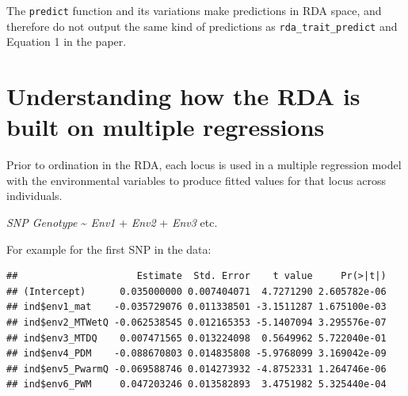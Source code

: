 \documentclass[
]{article}
\newenvironment{Shaded}{\begin{snugshade}}{\end{snugshade}}
\newcommand{\CommentTok}[1]{\textcolor[rgb]{0.56,0.35,0.01}{\textit{#1}}}
\newcommand{\DecValTok}[1]{\textcolor[rgb]{0.00,0.00,0.81}{#1}}
\newcommand{\FunctionTok}[1]{\textcolor[rgb]{0.00,0.00,0.00}{#1}}
\newcommand{\NormalTok}[1]{#1}
\newcommand{\OtherTok}[1]{\textcolor[rgb]{0.56,0.35,0.01}{#1}}
\newcommand{\SpecialCharTok}[1]{\textcolor[rgb]{0.00,0.00,0.00}{#1}}
\begin{document}
The \texttt{predict} function and its variations make predictions in RDA
space, and therefore do not output the same kind of predictions as
\texttt{rda\_trait\_predict} and Equation 1 in the paper.

\hypertarget{understanding-how-the-rda-is-built-on-multiple-regressions}{%
\section{Understanding how the RDA is built on multiple
regressions}\label{understanding-how-the-rda-is-built-on-multiple-regressions}}

Prior to ordination in the RDA, each locus is used in a multiple
regression model with the environmental variables to produce fitted
values for that locus across individuals.

\emph{SNP Genotype} \textasciitilde{} \emph{Env1} + \emph{Env2} +
\emph{Env3} etc.

For example for the first SNP in the data:

\begin{Shaded}
\end{Shaded}

\begin{verbatim}
##                     Estimate  Std. Error    t value     Pr(>|t|)
## (Intercept)      0.035000000 0.007404071  4.7271290 2.605782e-06
## ind$env1_mat    -0.035729076 0.011338501 -3.1511287 1.675100e-03
## ind$env2_MTWetQ -0.062538545 0.012165353 -5.1407094 3.295576e-07
## ind$env3_MTDQ    0.007471565 0.013224098  0.5649962 5.722040e-01
## ind$env4_PDM    -0.088670803 0.014835808 -5.9768099 3.169042e-09
## ind$env5_PwarmQ -0.069588746 0.014273932 -4.8752331 1.264746e-06
## ind$env6_PWM     0.047203246 0.013582893  3.4751982 5.325440e-04
\end{verbatim}
\end{document}
